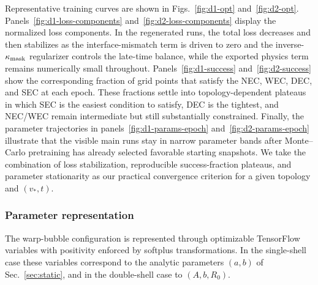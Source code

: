 \documentclass[11pt]{article}
\begin{document}
Representative training curves are shown in Figs.~\ref{fig:d1-opt} and~\ref{fig:d2-opt}. Panels~\ref{fig:d1-loss-components} and~\ref{fig:d2-loss-components} display the normalized loss components. In the regenerated runs, the total loss decreases and then stabilizes as the interface-mismatch term is driven to zero and the inverse-$\kappa_{\rm mask}$ regularizer controls the late-time balance, while the exported physics term remains numerically small throughout. Panels~\ref{fig:d1-success} and~\ref{fig:d2-success} show the corresponding fraction of grid points that satisfy the NEC, WEC, DEC, and SEC at each epoch. These fractions settle into topology-dependent plateaus in which SEC is the easiest condition to satisfy, DEC is the tightest, and NEC/WEC remain intermediate but still substantially constrained. Finally, the parameter trajectories in panels~\ref{fig:d1-params-epoch} and~\ref{fig:d2-params-epoch} illustrate that the visible main runs stay in narrow parameter bands after Monte--Carlo pretraining has already selected favorable starting snapshots. We take the combination of loss stabilization, reproducible success-fraction plateaus, and parameter stationarity as our practical convergence criterion for a given topology and $(v_*,t)$.

\subsubsection{Parameter representation}
The warp-bubble configuration is represented through optimizable TensorFlow variables with positivity enforced by softplus transformations. In the single-shell case these variables correspond to the analytic parameters $(a,b)$ of Sec.~\ref{sec:static}, and in the double-shell case to $(A,b,R_0)$.
\end{document}
